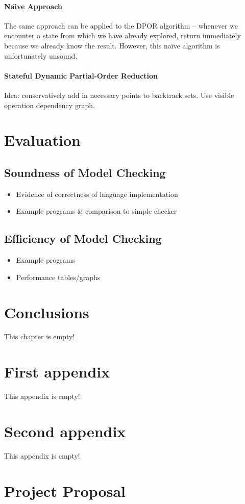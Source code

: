 \documentclass[12pt,a4paper,twoside,openright]{report}
\begin{document}
\subsubsection{Na\"{\i}ve Approach}
The same approach can be applied to
the DPOR algorithm -- whenever we
encounter a state from which we have already
explored, return immediately because we
already know the result. However, this
na\"ive algorithm is unfortunately unsound.


\subsubsection{Stateful Dynamic Partial-Order Reduction}
Idea: conservatively add in necessary points to backtrack sets.
Use visible operation dependency graph.

\chapter{Evaluation}

\section{Soundness of Model Checking}

\begin{itemize}
	\item Evidence of correctness of language implementation
	\item Example programs \& comparison to simple checker
\end{itemize}

\section{Efficiency of Model Checking}

\begin{itemize}
	\item Example programs
	\item Performance tables/graphs
\end{itemize}

\chapter{Conclusions}

This chapter is empty!




\appendix

\chapter{First appendix}
 
 This appendix is empty!
 
\chapter{Second appendix}

This appendix is empty!

\chapter{Project Proposal}


\end{document}
